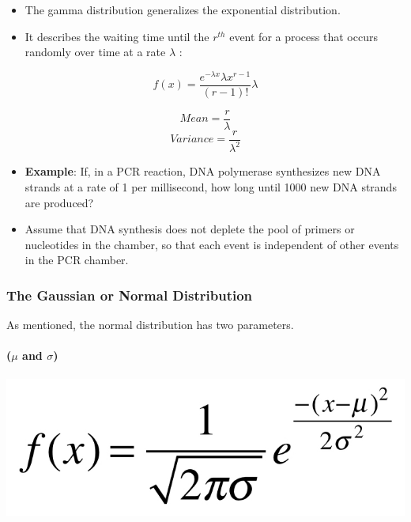 \documentclass[]{book}
\providecommand{\tightlist}{%
  \setlength{\itemsep}{0pt}\setlength{\parskip}{0pt}}
\let\oldparagraph\paragraph
\renewcommand{\paragraph}[1]{\oldparagraph{#1}\mbox{}}
\begin{document}
\begin{itemize}
\tightlist
\item
  The gamma distribution generalizes the exponential distribution.
\item
  It describes the waiting time until the \(r^{th}\) event for a process that occurs randomly over time at a rate \(\lambda\) :
\end{itemize}

\[f(x) = \frac{e^{-\lambda x}\lambda x^{r-1}}{(r-1)!}\lambda\]

\[ Mean =  \frac{r}{\lambda} \]
\[ Variance = \frac{r}{\lambda^2} \]

\begin{itemize}
\tightlist
\item
  \textbf{Example}: If, in a PCR reaction, DNA polymerase synthesizes new DNA strands at a rate of 1 per millisecond, how long until 1000 new DNA strands are produced?
\end{itemize}

\begin{itemize}
\tightlist
\item
  Assume that DNA synthesis does not deplete the pool of primers or nucleotides in the chamber, so that each event is independent of other events in the PCR chamber.
\end{itemize}

\hypertarget{the-gaussian-or-normal-distribution}{%
\subsubsection{The Gaussian or Normal Distribution}\label{the-gaussian-or-normal-distribution}}

As mentioned, the normal distribution has two parameters.

\hypertarget{mu-and-sigma}{%
\paragraph{\texorpdfstring{(\(\mu\) and \(\sigma\))}{(\textbackslash{}mu and \textbackslash{}sigma)}}\label{mu-and-sigma}}

\begin{center}\includegraphics[width=0.4\linewidth]{images/week_2.032} \end{center}
\end{document}
